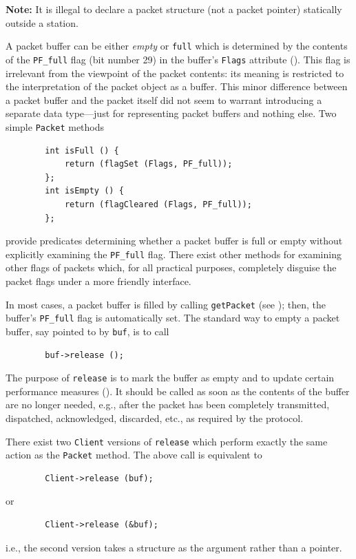 \medskip

\noindent
{\bf Note:} It is illegal to declare a packet structure (not a packet pointer)
statically outside a station.

\medskip

A packet buffer can be either {\em empty\/} or {\tt full} which is determined
by the contents of the {\tt PF\_full} flag (bit number 29)
in the buffer's {\tt Flags} attribute ().
This flag is irrelevant from the viewpoint of the packet contents: its
meaning is restricted to the interpretation of the packet object as a
buffer.
This minor difference between a packet buffer and the packet itself did not
seem to warrant introducing a separate data type---just for representing
packet buffers and nothing else.
Two simple {\tt Packet} methods
\begin{verbatim}
        int isFull () {
            return (flagSet (Flags, PF_full));
        };
        int isEmpty () {
            return (flagCleared (Flags, PF_full));
        };
\end{verbatim}
provide predicates determining whether a packet buffer is full or
empty without explicitly examining the {\tt PF\_full} flag.
There exist other methods for examining other flags of packets which, for
all practical purposes, completely disguise the packet flags under
a more friendly interface.

In most cases, a packet buffer is filled by calling {\tt getPacket}
(see ); then,
the buffer's {\tt PF\_full} flag is automatically set.
The standard way to empty a packet buffer, say pointed to by {\tt buf},
is to call
\begin{verbatim}
        buf->release ();
\end{verbatim}
\noindent
The purpose of {\tt release} is to mark the buffer as empty and to update
certain performance measures ().
It should be called as soon as the contents of the buffer are no longer
needed, e.g., after the packet has been completely transmitted, dispatched,
acknowledged, discarded, etc., as required by the protocol.

There exist two {\tt Client} versions of {\tt release} which perform exactly
the same action as the {\tt Packet} method.
The above call is equivalent to
\begin{verbatim}
        Client->release (buf);
\end{verbatim}
or
\begin{verbatim}
        Client->release (&buf);
\end{verbatim}
i.e., the second version takes a structure as the argument rather than a
pointer.

